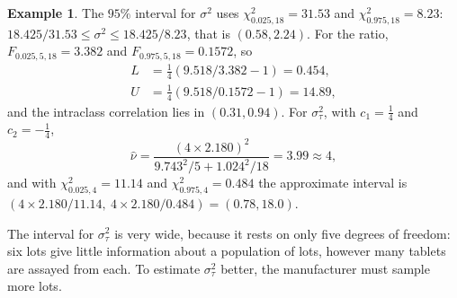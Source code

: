 \documentclass[11pt,a4paper]{article}
\numberwithin{equation}{section}
\theoremstyle{definition}
\newtheorem{exa}[thm]{Example}
\begin{document}
\begin{exa}
The $95\%$ interval for $\sigma^2$ uses $\chi^2_{0.025, 18} = 31.53$ and $\chi^2_{0.975, 18} = 8.23$: $18.425/31.53 \le \sigma^2 \le 18.425/8.23$, that is $(0.58, 2.24)$. For the ratio, $F_{0.025, 5, 18} = 3.382$ and
$F_{0.975, 5, 18} = 0.1572$, so
\begin{align*}
L &= \tfrac14(9.518/3.382 - 1) = 0.454 , \\
U &= \tfrac14(9.518/0.1572 - 1) = 14.89 ,
\end{align*}
and the intraclass correlation lies in $(0.31, 0.94)$. For $\sigma^2_\tau$, with $c_1 = \frac14$ and $c_2 = -\frac14$,
\[
\hat\nu = \frac{(4\times2.180)^2}{9.743^2/5 + 1.024^2/18} = 3.99 \approx 4 ,
\]
and with $\chi^2_{0.025, 4} = 11.14$ and $\chi^2_{0.975, 4} = 0.484$ the approximate interval is $(4\times2.180/11.14,\ 4\times2.180/0.484) = (0.78, 18.0)$.

The interval for $\sigma^2_\tau$ is very wide, because it rests on only five degrees of freedom: six lots give little information about a population of
lots, however many tablets are assayed from each. To estimate $\sigma^2_\tau$ better, the manufacturer must sample more lots.
\end{exa}
\end{document}
